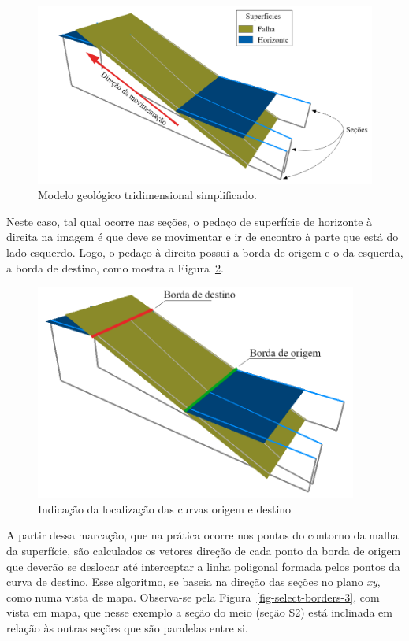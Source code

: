 \begin{figure} [H]
  \begin{center}
    \includegraphics[width=350pt]{images/fig-select-borders-1}
    \caption{Modelo geológico tridimensional simplificado.}\label{fig-select-borders-1}
  \end{center}
\end{figure}

Neste caso, tal qual ocorre nas seções, o pedaço de superfície de horizonte à direita na imagem é que deve se movimentar e ir de encontro à parte que está do lado esquerdo. Logo, o pedaço à direita possui a borda de origem e o da esquerda, a borda de destino, como mostra a Figura~\ref{fig-select-borders-2}.

\begin{figure} [H]
  \begin{center}
    \includegraphics[width=300pt]{images/fig-select-borders-2}
    \caption{Indicação da localização das curvas origem e destino}\label{fig-select-borders-2}
  \end{center}
\end{figure}

A partir dessa marcação, que na prática ocorre nos pontos do contorno da malha da superfície, são calculados os vetores direção de cada ponto da borda de origem que deverão se deslocar até interceptar a linha poligonal formada pelos pontos da curva de destino. Esse algoritmo, se baseia na direção das seções no plano \textit{xy}, como numa vista de mapa. Observa-se pela Figura~\ref{fig-select-borders-3}, com vista em mapa, que nesse exemplo a seção do meio (seção S2) está inclinada em relação às outras seções que são paralelas entre si.

